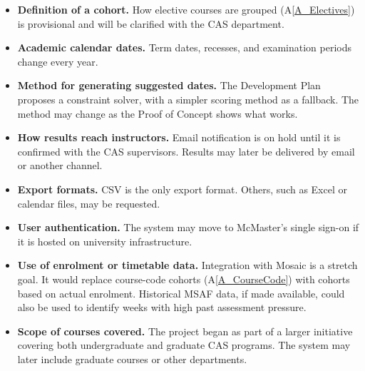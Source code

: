 \documentclass[12pt]{article}
\newcounter{lcnum} %
\newcommand{\asref}[1]{A\ref{#1}}
\begin{document}
\begin{itemize}
\item[LC\refstepcounter{lcnum}\thelcnum\label{LC_CohortDefinition}:]
  \textbf{Definition of a cohort.} How elective courses are grouped
  (\asref{A_Electives}) is provisional and will be clarified with the CAS
  department.

\item[LC\refstepcounter{lcnum}\thelcnum\label{LC_AcademicCalendar}:]
  \textbf{Academic calendar dates.} Term dates, recesses, and examination
  periods change every year.

\item[LC\refstepcounter{lcnum}\thelcnum\label{LC_SchedulingMethod}:]
  \textbf{Method for generating suggested dates.} The Development
  Plan~\citep{TeamBVSH2026DP} proposes a constraint solver, with a simpler scoring method as a fallback.
  The method may change as the Proof of Concept shows what works.

\item[LC\refstepcounter{lcnum}\thelcnum\label{LC_Notification}:]
  \textbf{How results reach instructors.} Email notification is on hold until
  it is confirmed with the CAS supervisors. Results may later be delivered by
  email or another channel.

\item[LC\refstepcounter{lcnum}\thelcnum\label{LC_ExportFormat}:]
  \textbf{Export formats.} CSV is the only export format. Others, such as
  Excel or calendar files, may be requested.

\item[LC\refstepcounter{lcnum}\thelcnum\label{LC_Authentication}:]
  \textbf{User authentication.} The system may move to McMaster's single
  sign-on if it is hosted on university infrastructure.

\item[LC\refstepcounter{lcnum}\thelcnum\label{LC_Mosaic}:] \textbf{Use of
  enrolment or timetable data.} Integration with Mosaic is a stretch goal. It
  would replace course-code cohorts (\asref{A_CourseCode}) with cohorts based
  on actual enrolment. Historical MSAF data, if made available, could also be
  used to identify weeks with high past assessment pressure.

\item[LC\refstepcounter{lcnum}\thelcnum\label{LC_ScopeExpansion}:]
  \textbf{Scope of courses covered.} The project began as part of a larger
  initiative covering both undergraduate and graduate CAS programs. The
  system may later include graduate courses or other departments.

\end{itemize}
\end{document}
